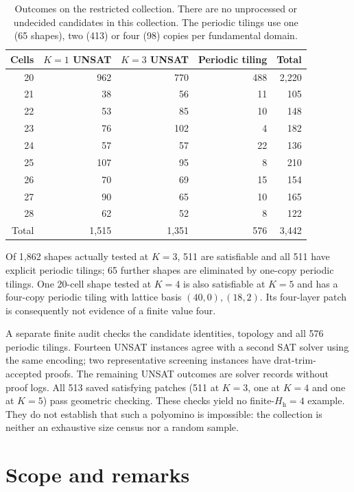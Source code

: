 \documentclass[10pt,a4paper]{article}
\theoremstyle{definition}
\theoremstyle{remark}
\newcommand{\Hh}{H_{\mathrm h}}
\begin{document}
\begin{table}[!htbp]
\centering\small
\begin{tabular}{@{}rrrrr@{}}
\toprule
Cells & $K=1$ UNSAT & $K=3$ UNSAT & Periodic tiling & Total\\
\midrule
20 & 962 & 770 & 488 & 2,220\\
21 & 38 & 56 & 11 & 105\\
22 & 53 & 85 & 10 & 148\\
23 & 76 & 102 & 4 & 182\\
24 & 57 & 57 & 22 & 136\\
25 & 107 & 95 & 8 & 210\\
26 & 70 & 69 & 15 & 154\\
27 & 90 & 65 & 10 & 165\\
28 & 62 & 52 & 8 & 122\\
\midrule
Total & 1,515 & 1,351 & 576 & 3,442\\
\bottomrule
\end{tabular}
\caption{Outcomes on the restricted collection. There are no unprocessed
or undecided candidates in this collection. The periodic tilings use
one (65 shapes), two (413) or four (98) copies per fundamental domain.}
\label{tab:search}
\end{table}

Of 1,862 shapes actually tested at $K=3$, 511 are satisfiable and all
511 have explicit periodic tilings; 65 further shapes are eliminated by
one-copy periodic tilings. One 20-cell shape tested at $K=4$ is also
satisfiable at $K=5$ and has a four-copy periodic tiling with lattice
basis $(40,0),(18,2)$. Its four-layer patch is consequently not evidence
of a finite value four.

A separate finite audit checks the candidate identities, topology and
all 576 periodic tilings. Fourteen UNSAT instances agree with a second
SAT solver using the same encoding; two representative screening
instances have drat-trim-accepted proofs. The remaining UNSAT outcomes
are solver records without proof logs. All 513 saved satisfying patches
(511 at $K=3$, one at $K=4$ and one at $K=5$) pass geometric checking.
These checks yield no finite-$\Hh=4$ example. They do not establish
that such a polyomino is impossible: the collection is neither an
exhaustive size census nor a random sample.

\section{Scope and remarks}
\label{sec:scope}
\end{document}
